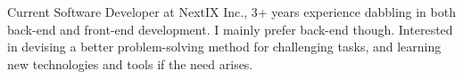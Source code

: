 

\begin{cvparagraph}

Current Software Developer at NextIX Inc., 3+ years experience dabbling in both back-end and front-end development. I mainly prefer back-end though. Interested in devising a better problem-solving method for challenging tasks, and learning new technologies and tools if the need arises.
\end{cvparagraph}
